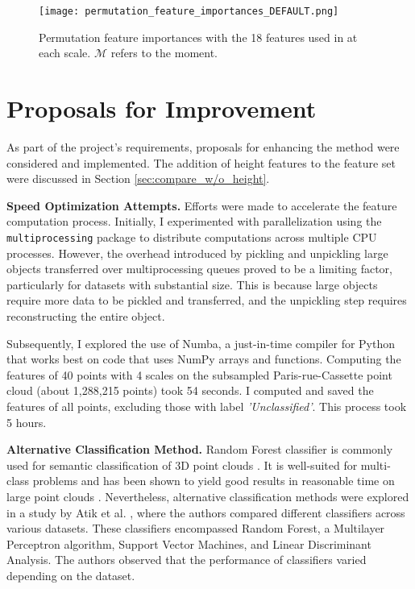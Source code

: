 \documentclass{article}
\begin{document}
\begin{figure}
    \hspace*{-2cm}
    \texttt{[image: permutation\_feature\_importances\_DEFAULT.png]}
    \caption{Permutation feature importances with the 18 features used in \cite{thomas_semantic_2018} at each scale. $\mathcal{M}$ refers to the moment.}
    \label{fig:permutation_default}
\end{figure}

\section{Proposals for Improvement}\label{sec:classification}

As part of the project's requirements, proposals for enhancing the method were considered and implemented. The addition of height features to the feature set were discussed in Section \ref{sec:compare_w/o_height}.

\textbf{Speed Optimization Attempts.} Efforts were made to accelerate the feature computation process. Initially, I experimented with parallelization using the \texttt{multiprocessing} package to distribute computations across multiple CPU processes. However, the overhead introduced by pickling and unpickling large objects transferred over multiprocessing queues proved to be a limiting factor, particularly for datasets with substantial size. This is because large objects require more data to be pickled and transferred, and the unpickling step requires reconstructing the entire object. 

Subsequently, I explored the use of Numba, a just-in-time compiler for Python that works best on code that uses NumPy arrays and functions. Computing the features of 40 points with 4 scales on the subsampled Paris-rue-Cassette point cloud (about 1,288,215 points) took 54 seconds. I computed and saved the features of all points, excluding those with label \textit{'Unclassified'}. This process took 5 hours.

\textbf{Alternative Classification Method.} Random Forest classifier is commonly used for semantic classification of 3D point clouds \cite{thomas_semantic_2018,hackel_fast_nodate}. It is well-suited for multi-class problems and has been shown to yield good results in reasonable time on large point clouds \cite{weinmann_semantic_2015,atik_machine_2021}. Nevertheless, alternative classification methods were explored in a study by Atik et al. \cite{atik_machine_2021}, where the authors compared different classifiers across various datasets. These classifiers encompassed Random Forest, a Multilayer Perceptron algorithm, Support Vector Machines, and Linear Discriminant Analysis. The authors observed that the performance of classifiers varied depending on the dataset.
\end{document}
